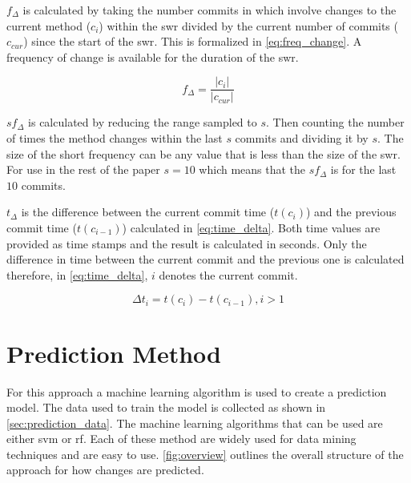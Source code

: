$f_{\Delta}$ is calculated by taking the number commits in which involve changes to the current method ($c_i$) within the \gls{swr} divided by the current number of commits ($c_{cur}$) since the start of the \gls{swr}. This is formalized in \autoref{eq:freq_change}. A frequency of change is available for the duration of the \gls{swr}.

\begin{equation}
\label{eq:freq_change}
f_{\Delta} = \frac{|c_i|}{|c_{cur}|}
\end{equation}

$sf_{\Delta}$ is calculated by reducing the range sampled to $s$. Then counting the number of times the method changes within the last $s$ commits and dividing it by $s$. The size of the short frequency can be any value that is less than the size of the \gls{swr}. For use in the rest of the paper $s = 10$ which means that the $sf_{\Delta}$ is for the last $10$ commits.


$t_\Delta$ is the difference between the current commit time ($t(c_i)$) and the previous commit time ($t(c_{i-1})$) calculated in \autoref{eq:time_delta}. Both time values are provided as time stamps and the result is calculated in seconds. Only the difference in time between the current commit and the previous one is calculated therefore, in \autoref{eq:time_delta}, $i$ denotes the current commit.

\begin{equation}
\label{eq:time_delta}
\Delta t_{i} = t(c_i) - t(c_{i-1}), i > 1
\end{equation}

\section{Prediction Method}
\label{sec:prediction_method}


For this approach a machine learning algorithm is used to create a prediction model. The data used to train the model is collected as shown in \autoref{sec:prediction_data}. The machine learning algorithms that can be used are either \gls{svm} or \gls{rf}. Each of these method are widely used for data mining techniques and are easy to use. \autoref{fig:overview} outlines the overall structure of the approach for how changes are predicted.

